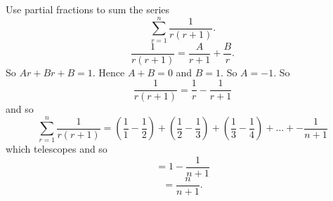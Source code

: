 Use partial fractions to sum the series
\[
\sum^n_{r=1} \frac{1}{r(r+1)}.
\]
\newline
\[
\frac{1}{r(r+1)} = \frac{A}{r+1} + \frac{B}{r}.
\]
So $Ar + Br + B = 1$. Hence $A+B= 0$ and $B = 1$. So $A = -1$. So
\[
\frac{1}{r(r+1)} = \frac{1}{r} - \frac{1}{r+1}
\]
and so 
\[
\sum^n_{r=1} \frac{1}{r(r+1)} = (\frac{1}{1} - \frac{1}{2}) + (\frac{1}{2} - \frac{1}{3}) + (\frac{1}{3} - \frac{1}{4}) + \hdots + -\frac{1}{n+1}
\]
which telescopes and so
\[
= 1 - \frac{1}{n+1}
\]
\[
= \frac{n}{n+1}.
\]